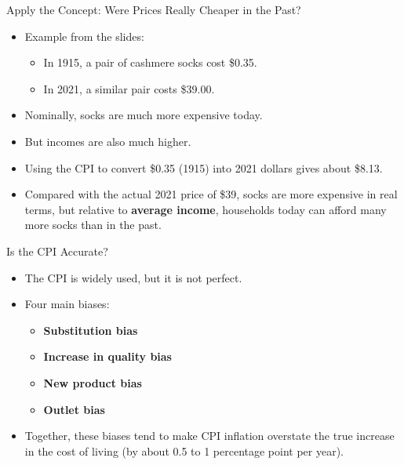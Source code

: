 \documentclass[aspectratio=169]{beamer}
\begin{document}
\begin{frame}{Apply the Concept: Were Prices Really Cheaper in the Past?}
\transfade
\begin{itemize}
  \item Example from the slides:
  \begin{itemize}
    \item In 1915, a pair of cashmere socks cost \$0.35.
    \item In 2021, a similar pair costs \$39.00.
  \end{itemize}
  \item Nominally, socks are much more expensive today.
  \item But incomes are also much higher.
  \item Using the CPI to convert \$0.35 (1915) into 2021 dollars gives about \$8.13.
  \item Compared with the actual 2021 price of \$39, socks are more expensive in real terms, but relative to \textbf{average income}, households today can afford many more socks than in the past.
\end{itemize}
\end{frame}

\begin{frame}{Is the CPI Accurate?}
\transfade
\begin{itemize}
  \item The CPI is widely used, but it is not perfect.
  \item Four main biases:
  \begin{itemize}
    \item \textbf{Substitution bias}
    \item \textbf{Increase in quality bias}
    \item \textbf{New product bias}
    \item \textbf{Outlet bias}
  \end{itemize}
  \item Together, these biases tend to make CPI inflation \alert{overstate} the true increase in the cost of living (by about 0.5 to 1 percentage point per year).
\end{itemize}
\end{frame}
\end{document}
